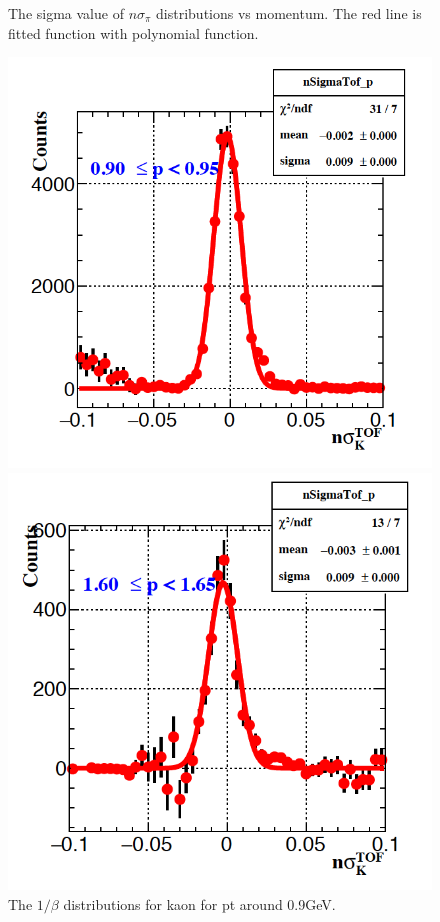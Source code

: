\begin{figure}[htbp]
\begin{minipage}[htbp]{0.5\linewidth}
\caption{The sigma value of $n\sigma_{\pi}$ distributions vs momentum. The red line is fitted function with polynomial function. \label{fig:pionsigma}}
\end{minipage}
\end{figure}

\begin{figure}[htbp]
\begin{minipage}[htbp]{0.5\linewidth}
\centering
\includegraphics[width=1.0\textwidth]{figure/Run14_D0HFT/nsigmaK_tof_1.png}
\caption{The $1/\beta$ distributions for kaon for pt around 0.9GeV. \label{fig:kaon_1beta1}}
\end{minipage}
\hfill
\begin{minipage}[htbp]{0.5\linewidth}
\centering
\includegraphics[width=1.0\textwidth]{figure/Run14_D0HFT/nsigmaK_tof_2.png}

\end{minipage}
\end{figure}
